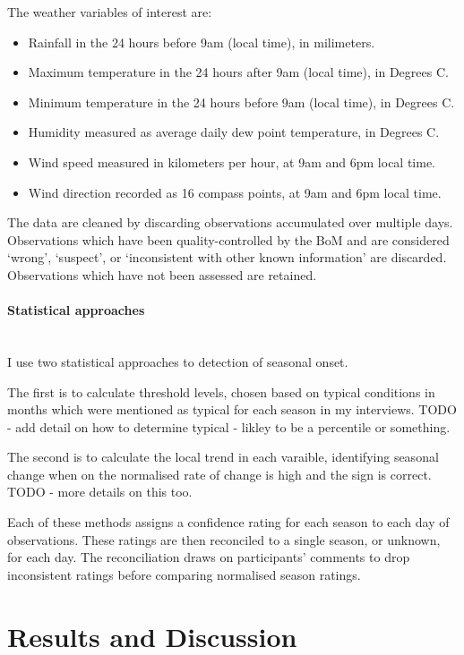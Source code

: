 The weather variables of interest are:
\begin{itemize}
\item Rainfall in the 24 hours before 9am (local time), in milimeters.
\item Maximum temperature in the 24 hours after 9am (local time), in Degrees C.
\item Minimum temperature in the 24 hours before 9am (local time), in Degrees C.
\item Humidity measured as average daily dew point temperature, in Degrees C.
\item Wind speed measured in kilometers per hour, at 9am and 6pm local time.
\item Wind direction recorded as 16 compass points, at 9am and 6pm local time.
\end{itemize}

The data are cleaned by discarding observations accumulated over multiple days.
Observations which have been quality-controlled by the BoM and are considered
`wrong', `suspect', or `inconsistent with other known information' are discarded.
Observations which have not been assessed are retained.


\paragraph{Statistical approaches}~\\
I use two statistical approaches to detection of seasonal onset.

The first is to calculate threshold levels, chosen based on typical conditions
in months which were mentioned as typical for each season in my interviews.
TODO - add detail on how to determine typical - likley to be a percentile or something.

The second is to calculate the local trend in each varaible, identifying seasonal
change when on the normalised rate of change is high and the sign is correct.
TODO - more details on this too.

Each of these methods assigns a confidence rating for each season to each day of
observations.  These ratings are then reconciled to a single season, or unknown,
for each day.  The reconciliation draws on participants' comments to drop inconsistent
ratings before comparing normalised season ratings.




\section{Results and Discussion}

